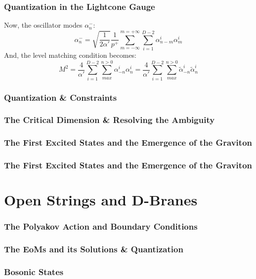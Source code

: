 \documentclass[aspectratio=169]{beamer}
\begin{document}
	\begin{frame}
		\frametitle{Quantization in the Lightcone Gauge}
		Now, the oscillator modes $\alpha^-_n$:
		\begin{equation*}
			\alpha_n^- = \sqrt{\frac{1}{2\alpha'}} \frac{1}{p^+} \sum_{m=-\infty}^{m=+\infty}\sum_{i=1}^{D-2}\alpha^i_{n-m}\alpha^i_m
		\end{equation*}
		And, the level matching condition becomes:
		\begin{equation*}
			M^2 = \frac{4}{\alpha'} \sum_{i=1}^{D-2}\sum_{max}^{n>0}\alpha^i_{-n}\alpha^i_n = \frac{4}{\alpha'} \sum_{i=1}^{D-2}\sum_{max}^{n>0}\tilde{\alpha}^i_{-n}\tilde{\alpha}^i_n 
		\end{equation*}
	\end{frame}

	\begin{frame}
		\frametitle{Quantization \& Constraints}
	\end{frame}

	\begin{frame}
		\frametitle{The Critical Dimension \& Resolving the Ambiguity}
	\end{frame}


	\begin{frame}
		\frametitle{The First Excited States and the Emergence of the Graviton}
	\end{frame}

	\begin{frame}
		\frametitle{The First Excited States and the Emergence of the Graviton}
	\end{frame}

	\section{Open Strings and D-Branes}
	
	\begin{frame}
		\frametitle{The Polyakov Action and Boundary Conditions}
	\end{frame}

	\begin{frame}
		\frametitle{The EoMs and its Solutions \& Quantization}
	\end{frame}

	\begin{frame}
		\frametitle{Bosonic States}
	\end{frame}

\end{document}
